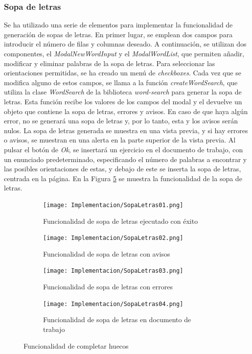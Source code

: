 \subsubsection{Sopa de letras}
\label{sec:impsopaletras}
Se ha utilizado una serie de elementos para implementar la funcionalidad de generación de sopas de letras. En primer lugar, se emplean dos campos para introducir el número de filas y columnas deseado. A continuación, se utilizan dos componentes, el \textit{ModalNewWordInput} y el \textit{ModalWordList}, que permiten añadir, modificar y eliminar palabras de la sopa de letras. Para seleccionar las orientaciones permitidas, se ha creado un menú de \textit{checkboxes}. Cada vez que se modifica alguno de estos campos, se llama a la función \textit{createWordSearch}, que utiliza la clase \textit{WordSearch} de la biblioteca \textit{word-search} para generar la sopa de letras. Esta función recibe los valores de los campos del modal y el devuelve un objeto que contiene la sopa de letras, errores y avisos. En caso de que haya algún error, no se generará una sopa de letras y, por lo tanto, esta y los avisos serán nulos. La sopa de letras generada se muestra en una vista previa, y si hay errores o avisos, se muestran en una alerta en la parte superior de la vista previa. Al pulsar el botón de \textit{Ok}, se insertará un ejercicio en el documento de trabajo, con un enunciado predeterminado, especificando el número de palabras a encontrar y las posibles orientaciones de estas, y debajo de este se inserta la sopa de letras, centrada en la página. En la Figura \ref{fig:impsopaletras} se muestra la funcionalidad de la sopa de letras.

\begin{figure}[ht!]
  \centering
  \begin{subfigure}{\textwidth}
    \centering
    \texttt{[image: Implementacion/SopaLetras01.png]}
    \caption{Funcionalidad de sopa de letras ejecutado con éxito}
    \label{fig:impsopaletras01}
  \end{subfigure}

  \begin{subfigure}{\textwidth}
    \centering
    \texttt{[image: Implementacion/SopaLetras02.png]}
    \caption{Funcionalidad de sopa de letras con avisos}
    \label{fig:impsopaletras02}
  \end{subfigure}

  \begin{subfigure}{\textwidth}
    \centering
    \texttt{[image: Implementacion/SopaLetras03.png]}
    \caption{Funcionalidad de sopa de letras con errores}
    \label{fig:impsopaletras03}
  \end{subfigure}

  \begin{subfigure}{\textwidth}
    \centering
    \texttt{[image: Implementacion/SopaLetras04.png]}
    \caption{Funcionalidad de sopa de letras en documento de trabajo}
    \label{fig:impsopaletras04}
  \end{subfigure}

  \caption{Funcionalidad de completar huecos}
  \label{fig:impsopaletras}
\end{figure}

